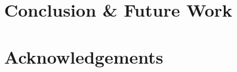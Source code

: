 \documentclass[10pt, titlepage]{article}
\theoremstyle{definition}
\begin{document}
\newpage
\section{Conclusion \& Future Work}\label{section:conclusion}

\newpage
\section{Acknowledgements}\label{section:acknowledgement}

\newpage
\nocite{*}




\newpage
\appendix
\end{document}
